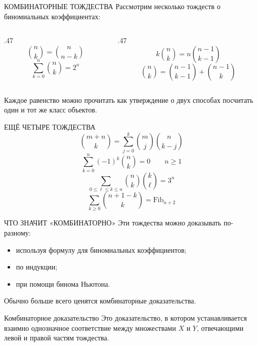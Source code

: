 \documentclass[aspectratio=169,11pt]{beamer}
\begin{document}
\begin{cttextframe}{КОМБИНАТОРНЫЕ ТОЖДЕСТВА}
Рассмотрим несколько тождеств о биномиальных коэффициентах:

\begin{columns}[T,onlytextwidth]
  \begin{column}{.47\textwidth}
    \[
      \binom nk=\binom n{n-k}
    \]
    \[
      \sum_{k=0}^{n}\binom nk=2^n
    \]
  \end{column}
  \begin{column}{.47\textwidth}
    \[
      k\binom nk=n\binom{n-1}{k-1}
    \]
    \[
      \binom nk=\binom{n-1}{k-1}+\binom{n-1}k
    \]
  \end{column}
\end{columns}
\vspace{.3cm}
Каждое равенство можно прочитать как утверждение о двух способах
посчитать один и тот же класс объектов.
\end{cttextframe}

\begin{cttextframe}{ЕЩЁ ЧЕТЫРЕ ТОЖДЕСТВА}
\[
  \binom{m+n}k=\sum_{j=0}^{k}\binom mj\binom n{k-j}
\]
\[
  \sum_{k=0}^{n}(-1)^k\binom nk=0
  \qquad n\ge1
\]
\[
  \sum_{0\le \ell\le k\le n}\binom nk\binom k\ell=3^n
\]
\[
  \sum_{k\ge0}\binom{n+1-k}{k}=\mathrm{Fib}_{n+2}
\]
\end{cttextframe}

\begin{cttextframe}{ЧТО ЗНАЧИТ «КОМБИНАТОРНО»}
Эти тождества можно доказывать по-разному:
\begin{itemize}
  \item используя формулу для биномиальных коэффициентов;
  \item по индукции;
  \item при помощи бинома Ньютона.
\end{itemize}

Обычно больше всего ценятся комбинаторные доказательства.
\\[5mm]
\begin{block}{Комбинаторное доказательство}
Это доказательство, в котором устанавливается взаимно однозначное
соответствие между множествами $X$ и $Y$, отвечающими левой и правой
частям тождества.
\end{block}
\end{cttextframe}

\end{document}
